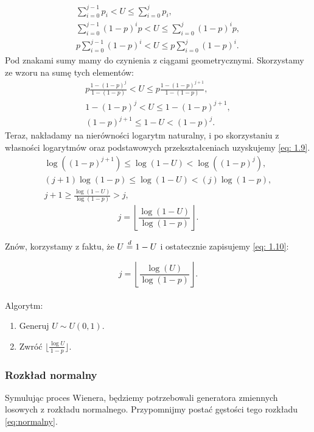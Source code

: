 \documentclass{article}
\theoremstyle{break}
\numberwithin{equation}{subsection}
\numberwithin{figure}{section}
\begin{document}
\begin{gather}
    \sum_{i=0}^{j-1}p_i<U\leq\sum_{i=0}^{j}p_i,\\
    \sum_{i=0}^{j-1}(1-p)^ip<U\leq\sum_{i=0}^{j}(1-p)^ip,\\
    p\sum_{i=0}^{j-1}(1-p)^i<U\leq p\sum_{i=0}^{j}(1-p)^i.
\end{gather}
Pod znakami sumy mamy do czynienia z ciągami geometrycznymi. Skorzystamy ze wzoru na sumę tych elementów:
\begin{gather}
    p\frac{1-(1-p)^{j}}{1-(1-p)}<U\leq p\frac{1-(1-p)^{j+1}}{1-(1-p)},\\
    1-(1-p)^{j} <U\leq 1-(1-p)^{j+1},\\
    (1-p)^{j+1}\leq 1-U<(1-p)^{j}.
\end{gather}
Teraz, nakładamy na nierówności logarytm naturalny, i po skorzystaniu z własności logarytmów oraz podstawowych przekształceniach uzyskujemy \eqref{eq: 1.9}.
\begin{gather}
    \log((1-p)^{j+1})\leq \log(1-U)<\log((1-p)^{j}),\\
    (j+1)\log(1-p)\leq \log(1-U)<(j)\log(1-p),\\
    j+1\geq\frac{\log(1-U)}{\log(1-p)}>j,
\end{gather}
\begin{equation}
    j=\left \lfloor{\frac{\log(1-U)}{\log(1-p)}}\right \rfloor. \label{eq: 1.9}
\end{equation}

Znów, korzystamy z faktu, że $U \buildrel d \over =1- U$ i ostatecznie zapisujemy \eqref{eq: 1.10}:

\begin{equation}
 j=\left \lfloor{\frac{\log(U)}{\log(1-p)}}\right \rfloor. \label{eq: 1.10}
\end{equation}
\\
Algorytm:

\begin{enumerate}
\item Generuj $U \sim U(0, 1)$.
\item Zwróć $\lfloor{\frac{\log{U}}{1-p}}\rfloor$.
\end{enumerate}

\subsubsection{Rozkład normalny}

Symulując proces Wienera, będziemy potrzebowali generatora zmiennych losowych z rozkładu normalnego. Przypomnijmy postać gęstości tego rozkładu \eqref{eq:normalny}.
\end{document}

